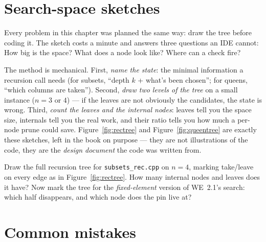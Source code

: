 \section{Search-space sketches}\label{sec:sketches}

Every problem in this chapter was planned the same way: draw the tree before
coding it. The sketch costs a minute and answers three questions an IDE
cannot: How big is the space? What does a node look like? Where can a check
fire?

The method is mechanical. First, \emph{name the state}: the minimal
information a recursion call needs (for subsets, ``depth $k$ + what's been
chosen''; for queens, ``which columns are taken''). Second, \emph{draw two
levels of the tree} on a small instance ($n = 3$ or $4$) --- if the leaves are
not obviously the candidates, the state is wrong. Third, \emph{count the
leaves and the internal nodes}: leaves tell you the space size, internals tell
you the real work, and their ratio tells you how much a per-node prune could
save. Figure~\ref{fig:rectree} and Figure~\ref{fig:queentree} are exactly
these sketches, left in the book on purpose --- they are not illustrations of
the code, they are the \emph{design document} the code was written from.

\begin{exercise}[medium]\label{exr:trace}
Draw the full recursion tree for \texttt{subsets\_rec.cpp} on $n = 4$, marking
take/leave on every edge as in Figure~\ref{fig:rectree}. How many internal
nodes and leaves does it have? Now mark the tree for the \emph{fixed-element}
version of WE~2.1's search: which half disappears, and which node does the
pin live at?
\end{exercise}

\section{Common mistakes}

